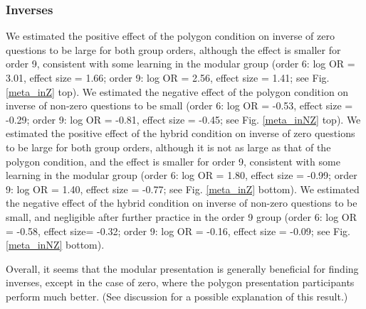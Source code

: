\documentclass[man,mask,10pt]{apa6}
\begin{document}
\subsubsection{Inverses} We estimated the positive effect of the polygon condition on inverse of zero questions to be large for both group orders, although the effect is smaller for order 9, consistent with some learning in the modular group (order 6: log OR = 3.01, effect size = 1.66; order 9: log OR = 2.56, effect size = 1.41; see Fig. \ref{meta_inZ} top). We estimated the negative effect of the polygon condition on inverse of non-zero questions to be small (order 6: log OR = -0.53, effect size = -0.29; order 9: log OR = -0.81, effect size = -0.45; see Fig. \ref{meta_inNZ} top). We estimated the positive effect of the hybrid condition on inverse of zero questions to be large for both group orders, although it is not as large as that of the polygon condition, and the effect is smaller for order 9, consistent with some learning in the modular group (order 6: log OR = 1.80, effect size = -0.99; order 9: log OR = 1.40, effect size = -0.77; see Fig. \ref{meta_inZ} bottom). We estimated the negative effect of the hybrid condition on inverse of non-zero questions to be small, and negligible after further practice in the order 9 group (order 6: log OR = -0.58, effect size= -0.32; order 9: log OR = -0.16, effect size = -0.09; see Fig. \ref{meta_inNZ} bottom).\par
Overall, it seems that the modular presentation is generally beneficial for finding inverses, except in the case of zero, where the polygon presentation participants perform much better. (See discussion for a possible explanation of this result.) 
\end{document}
